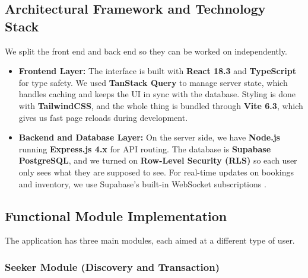 \documentclass[pdflatex,sn-mathphys-num]{sn-jnl}
\theoremstyle{thmstyleone}
\theoremstyle{thmstyletwo}
\theoremstyle{thmstylethree}
\begin{document}

\subsection{Architectural Framework and Technology Stack}%
\label{subsec:tech}

We split the front end and back end so they can be worked
on independently.
\begin{itemize}
    \item \textbf{Frontend Layer:}
      The interface is built with \textbf{React 18.3} and
      \textbf{TypeScript} for type safety.
      We used \textbf{TanStack Query} to manage server state,
      which handles caching and keeps the UI in sync with the
      database.
      Styling is done with \textbf{TailwindCSS}, and the whole
      thing is bundled through \textbf{Vite 6.3}, which gives
      us fast page reloads during development.

    \item \textbf{Backend and Database Layer:}
      On the server side, we have \textbf{Node.js} running
      \textbf{Express.js 4.x} for API routing.
      The database is \textbf{Supabase PostgreSQL}, and we
      turned on \textbf{Row-Level Security (RLS)} so each user
      only sees what they are supposed to see.
      For real-time updates on bookings and inventory, we use
      Supabase's built-in WebSocket subscriptions \cite{b6}.
\end{itemize}


\subsection{Functional Module Implementation}%
\label{subsec:modules}

The application has three main modules, each aimed at
a different type of user.

\subsubsection{Seeker Module (Discovery and Transaction)}%
\label{subsubsec:seeker}
\end{document}
